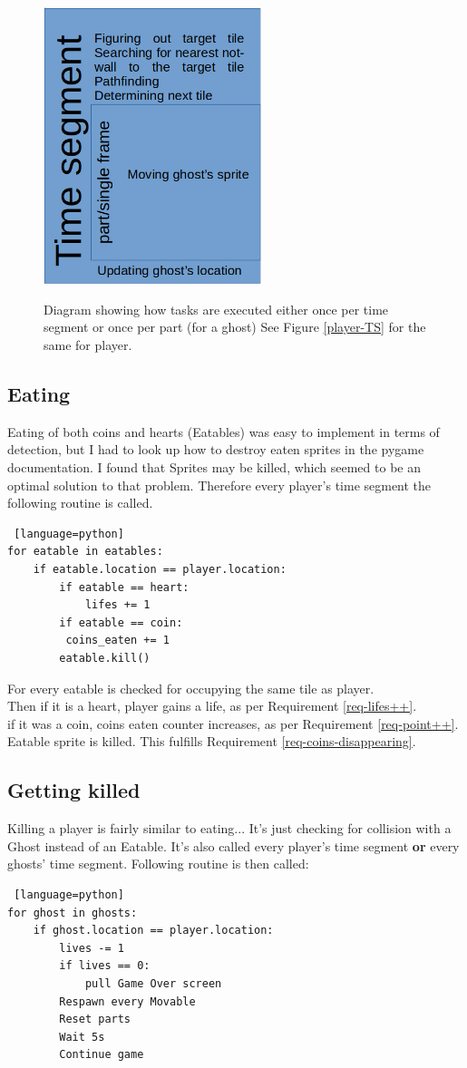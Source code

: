 \documentclass[11pt,a4paper,notitlepage]{report}
\newcommand{\dsubsection}[1]{\FloatBarrier \subsection{#1}}
\newenvironment{img}{
	\begin{center}
		\begin{figure}[H]
			\begin{center}
			
}{
	\end{center}
		\end{figure}
			\end{center}
}
\begin{document}
			\begin{img}
				\includegraphics[width=180pt]{images/ghost-time-segment}\\
				\caption{Diagram showing how tasks are executed either once per time segment or once per part (for a ghost) \newline See Figure \ref{player-TS} for the same for player.}
			\end{img}
			\dsubsection{Eating}
				Eating of both coins and hearts (Eatables) was easy to implement in terms of detection, but I had to look up how to destroy eaten sprites in the pygame documentation. I found that Sprites may be killed, which seemed to be an optimal solution to that problem. Therefore every player's time segment the following routine is called.
				\begin{lstlisting} [language=python]
for eatable in eatables:
	if eatable.location == player.location:
		if eatable == heart:
			lifes += 1
		if eatable == coin:
		 coins_eaten += 1
		eatable.kill()
				\end{lstlisting}
				For every eatable is checked for occupying the same tile as player.\\
				Then if it is a heart, player gains a life, as per Requirement \ref{req-lifes++}.\\
				if it was a coin, coins eaten counter increases, as per Requirement \ref{req-point++}.\\
				Eatable sprite is killed. This fulfills Requirement \ref{req-coins-disappearing}.
			\dsubsection{Getting killed}
				Killing a player is fairly similar to eating... It's just checking for collision with a Ghost instead of an Eatable. It's also called every player's time segment \textbf{or} every ghosts' time segment.
				Following routine is then called:
				\begin{lstlisting} [language=python]
for ghost in ghosts:
	if ghost.location == player.location:
		lives -= 1
		if lives == 0:
			pull Game Over screen
		Respawn every Movable
		Reset parts
		Wait 5s
		Continue game
				\end{lstlisting}
\end{document}
